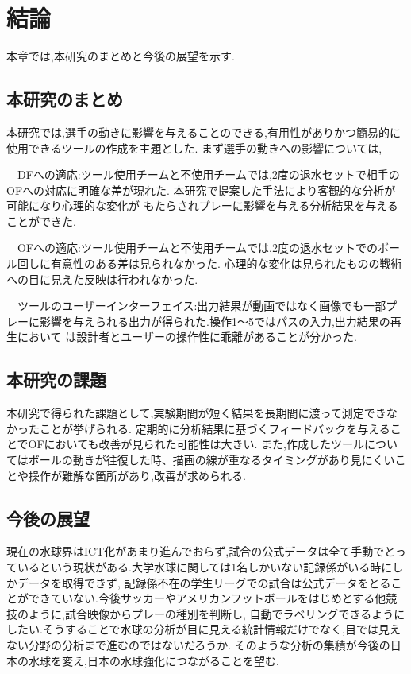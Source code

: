 \documentclass[../main.tex]{subfiles}
\begin{document}
\chapter{結論}

本章では,本研究のまとめと今後の展望を示す.

\section{本研究のまとめ}
本研究では,選手の動きに影響を与えることのできる,有用性がありかつ簡易的に使用できるツールの作成を主題とした.
まず選手の動きへの影響については,
\par　DFへの適応:ツール使用チームと不使用チームでは,2度の退水セットで相手のOFへの対応に明確な差が現れた.
本研究で提案した手法により客観的な分析が可能になり心理的な変化が
もたらされプレーに影響を与える分析結果を与えることができた.
\par　OFへの適応:ツール使用チームと不使用チームでは,2度の退水セットでのボール回しに有意性のある差は見られなかった.
心理的な変化は見られたものの戦術への目に見えた反映は行われなかった.
\par　ツールのユーザーインターフェイス:出力結果が動画ではなく画像でも一部プレーに影響を与えられる出力が得られた.操作1〜5ではパスの入力,出力結果の再生において
は設計者とユーザーの操作性に乖離があることが分かった.



\section{本研究の課題}
本研究で得られた課題として,実験期間が短く結果を長期間に渡って測定できなかったことが挙げられる.
定期的に分析結果に基づくフィードバックを与えることでOFにおいても改善が見られた可能性は大きい.
また,作成したツールについてはボールの動きが往復した時、描画の線が重なるタイミングがあり見にくいことや操作が難解な箇所があり,改善が求められる.


\section{今後の展望}
現在の水球界はICT化があまり進んでおらず,試合の公式データは全て手動でとっているという現状がある.大学水球に関しては1名しかいない記録係がいる時にしかデータを取得できず,
記録係不在の学生リーグでの試合は公式データをとることができていない.今後サッカーやアメリカンフットボールをはじめとする他競技のように,試合映像からプレーの種別を判断し,
自動でラベリングできるようにしたい.そうすることで水球の分析が目に見える統計情報だけでなく,目では見えない分野の分析まで進むのではないだろうか.
そのような分析の集積が今後の日本の水球を変え,日本の水球強化につながることを望む.
\end{document}

